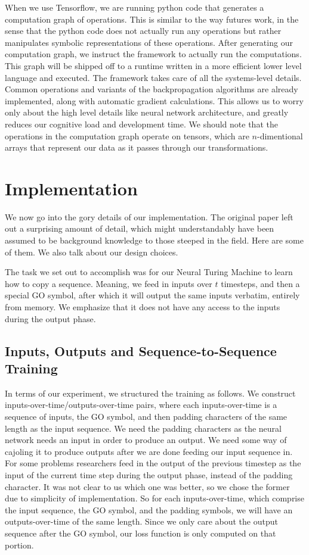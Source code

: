\documentclass[12pt]{article}
\begin{document}
When we use Tensorflow, we are running python code that generates a computation
graph of operations. This is similar to the way futures work, in the sense
that the python code does not actually run any operations but rather
manipulates symbolic representations of these operations. After generating
our computation graph, we instruct the framework to actually run the computations.
This graph will be shipped off to a runtime written in a more efficient lower level
language and executed. The framework takes care of all the systems-level details.
Common operations and variants of the backpropagation algorithms are already implemented,
along with automatic gradient calculations. This allows us to worry only about the
high level details like neural network architecture, and greatly reduces our cognitive
load and development time. We should note that the operations in the computation graph
operate on tensors, which are $n$-dimentional arrays that represent our data as
it passes through our transformations.

\section{Implementation}\label{implementation}

We now go into the gory details of our implementation. The original paper left out
a surprising amount of detail, which might understandably have been
assumed to be background knowledge to those steeped in the field. Here are
some of them. We also talk about our design choices.

The task we set out to accomplish was for our Neural Turing Machine to learn
how to copy a sequence. Meaning, we feed in inputs over $t$ timesteps, and then
a special GO symbol, after which it will output the same inputs verbatim, entirely
from memory. We emphasize that it does not have any access to the inputs during the output
phase.

\subsection{Inputs, Outputs and Sequence-to-Sequence Training}

In terms of our experiment, we structured the training as follows. We
construct inputs-over-time/outputs-over-time pairs, where each inputs-over-time
is a sequence of inputs, the GO symbol, and then padding characters of the same length as the
input sequence. We need the padding characters as the neural network needs an input in order to
produce an output. We need some way of cajoling it to produce outputs after we are done
feeding our input sequence in. For some problems researchers feed in the output of the previous
timestep as the input of the current time step during the output phase,
instead of the padding character.
It was not clear to us which one was better, so
we chose the former due to simplicity of implementation. So for each inputs-over-time,
which comprise the input sequence, the GO symbol, and the padding symbols,
we will have an outputs-over-time of the same length.
Since we only care about the output sequence after the GO symbol,
our loss function is only computed on that portion.
\end{document}
